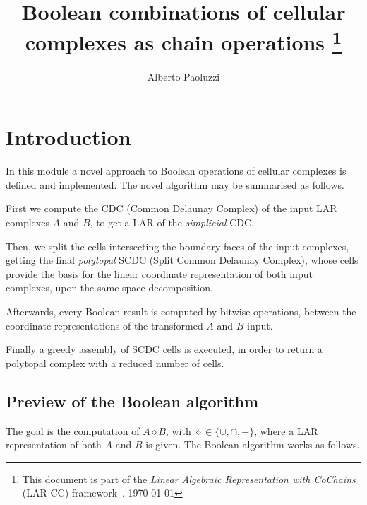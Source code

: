 \documentclass[11pt,oneside]{article}	%
\title{Boolean combinations of cellular complexes as chain operations
\footnote{This document is part of the \emph{Linear Algebraic Representation with CoChains} (LAR-CC) framework~\cite{cclar-proj:2013:00}. \today}
}
\author{Alberto Paoluzzi}
\begin{document}
\maketitle
\tableofcontents
\nonstopmode

\section{Introduction}

In this module a novel approach to Boolean operations of cellular complexes is defined and implemented. The novel algorithm may be summarised as follows. 

First we compute the CDC (Common Delaunay Complex) of the input LAR complexes $A$ and $B$, to get a LAR of the \emph{simplicial} CDC.

Then, we split the cells intersecting the boundary faces of the input complexes, getting the final \emph{polytopal} SCDC  
(Split Common Delaunay Complex), whose cells  provide the  basis for the linear coordinate representation of both input 
complexes, upon the same space decomposition.

Afterwards, every Boolean result is computed by bitwise operations, between the coordinate representations of the transformed $A$ and $B$ input.

Finally a greedy assembly of SCDC cells is executed, in order to return a polytopal complex with a reduced number of cells.



\subsection{Preview of the Boolean algorithm}

The goal is the computation of $A \diamond B$, with $\diamond\in \{\cup, \cap, -\}$, where a LAR representation of both $A$ and $B$ is given. The Boolean algorithm works as follows.
\end{document}
